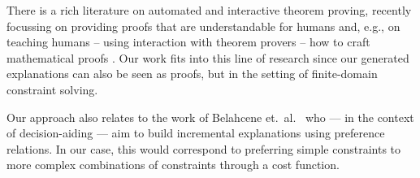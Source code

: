 

There is a rich literature on automated and interactive theorem proving, recently focussing on providing proofs that are understandable for humans \cite{Ganesalingam2017} and, e.g.,  on teaching humans -- using interaction with theorem provers -- how to craft mathematical proofs \cite{DBLP:conf/icml/YangD19}.
Our work fits into this line of research since our generated explanations can also be seen as proofs, but in the setting of finite-domain constraint solving. 



Our approach also relates to the work of Belahcene et.\ al.~\cite{belahcene2017explaining} who --- in the context of decision-aiding --- aim to build incremental explanations using preference relations. In our case, this would correspond to preferring simple constraints to more complex combinations of constraints through a cost function.
